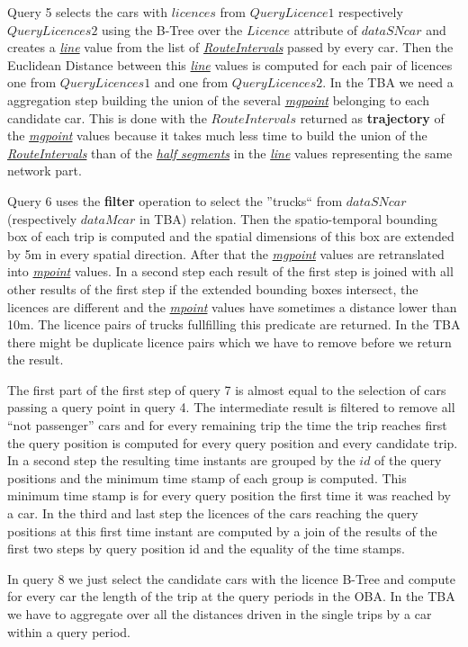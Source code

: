 \documentclass[a4paper]{article}
\newcommand{\op}[1]{\textbf{#1}}
\newcommand{\dt}[1]{\textsl{\underline{#1}}}
\begin{document}
Query 5 selects the cars with $licences$ from $QueryLicence1$ respectively
 $QueryLicences2$  using the B-Tree over the $Licence$ attribute of $dataSNcar$
and creates a \dt{line} value  from the list of \dt{RouteIntervals} passed by
every car. Then the Euclidean Distance between this \dt{line} values is computed
for each pair of licences one from $QueryLicences1$ and one  from $QueryLicences2$.
 In the TBA we need a aggregation step building the union of the several
 \dt{mgpoint} belonging to each candidate car. This is done with the $RouteIntervals$
 returned as \op{trajectory} of the \dt{mgpoint} values because it takes much less
 time to build the union of the  \dt{RouteIntervals} than of the \dt{half segments}
 in the  \dt{line} values representing the  same network part.

Query 6 uses the \op{filter} operation to select the ''trucks`` from $dataSNcar$
 (respectively $dataMcar$ in TBA) relation. Then the spatio-temporal bounding box of
 each trip is computed and the spatial dimensions of this box are extended by 5m in
 every spatial direction. After that the \dt{mgpoint} values are retranslated into
 \dt{mpoint} values. In a second step each result of the first step is joined with
 all other results of the first step if the extended bounding boxes intersect, the
 licences are different and the \dt{mpoint} values have sometimes a distance lower
 than 10m. The licence pairs of trucks fullfilling this predicate are returned. In
 the TBA there might be duplicate licence pairs which we have to remove before we
 return the result.

The first part of the first step of query 7 is almost equal to the selection of cars
 passing a query point in query 4. The intermediate result is filtered to remove all
 ``not passenger'' cars and for every remaining trip the time the trip reaches first
 the query position is computed for every query position and every candidate trip. In
 a second step the resulting time instants are grouped by the $id$ of the query
 positions and the minimum time stamp of each group is computed. This minimum time
 stamp is for every query position the first time it was reached by a car. In the
 third and last step the licences of the cars reaching the query positions at this
 first time instant are computed by a join of the results of the first two steps by
 query position id and the equality of the time stamps.

In query 8 we just select the candidate cars with the licence B-Tree and compute for
 every car the length of the trip at the query periods in the OBA. In the TBA we have
 to aggregate over all the distances driven in the single trips by a car within a
 query period.
\end{document}
